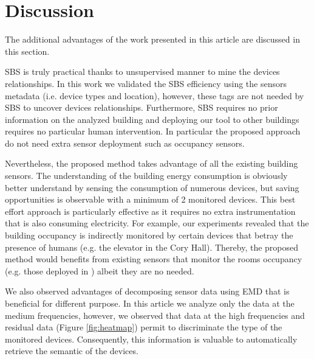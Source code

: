 \section{Discussion}
The additional advantages of the work presented in this article are discussed in this section.

SBS is truly practical thanks to unsupervised manner to mine the devices relationships. 
In this work we validated the SBS efficiency using the sensors metadata (i.e. device types and location), however, these tags are not needed by SBS to uncover devices relationships.
Furthermore, SBS requires no prior information on the analyzed building and deploying our tool to other buildings requires no particular human intervention.
In particular the proposed approach do not need extra sensor deployment such as occupancy sensors. 

Nevertheless, the proposed method takes advantage of all the existing building sensors.
The understanding of the building energy consumption is obviously better understand by sensing the consumption of numerous devices, 
but saving opportunities is observable with a minimum of 2 monitored devices.
This best effort approach is particularly effective as it requires no extra instrumentation that is also consuming electricity.
For example, our experiments revealed that the building occupancy is indirectly monitored by certain devices that betray the presence of humans (e.g. the elevator in the Cory Hall). 
Thereby, the proposed method would benefits from existing sensors that monitor the rooms occupancy (e.g. those deployed in \cite{agarwal:ipsn2011,erickson:ipsn2011}) albeit they are no needed.


We also observed advantages of decomposing sensor data using EMD that is beneficial for different purpose.
In this article we analyze only the data at the medium frequencies, however, we observed that data at the high frequencies and residual data (Figure \ref{fig:heatmap}) permit to discriminate the type of the monitored devices.
Consequently, this information is valuable to automatically retrieve the semantic of the devices.


% 
% 


